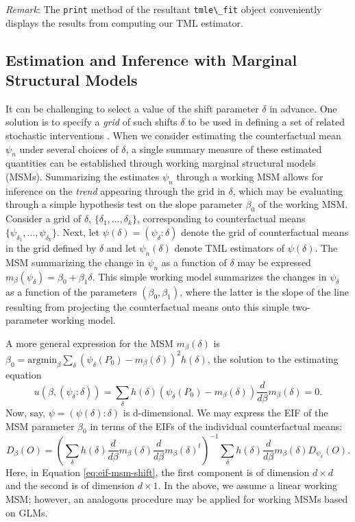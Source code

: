 \documentclass[
  12pt, krantz2,
]{krantz}
\newcommand{\passthrough}[1]{#1}
\newcommand{\1}{\mathbbm{1}}
\theoremstyle{definition}
\theoremstyle{definition}
\theoremstyle{definition}
\theoremstyle{definition}
\theoremstyle{remark}
\begin{document}
\emph{Remark}: The \passthrough{\lstinline!print!} method of the resultant \passthrough{\lstinline!tmle\_fit!} object conveniently
displays the results from computing our TML estimator.

\hypertarget{estimation-and-inference-with-marginal-structural-models}{%
\subsection{Estimation and Inference with Marginal Structural Models}\label{estimation-and-inference-with-marginal-structural-models}}

It can be challenging to select a value of the shift parameter \(\delta\) in
advance. One solution is to specify a \emph{grid} of such shifts \(\delta\) to be used
in defining a set of related stochastic interventions \citep{hejazi2020efficient}.
When we consider estimating the counterfactual mean \(\psi_n\) under several
choices of \(\delta\), a single summary measure of these estimated quantities can
be established through working marginal structural models (MSMs). Summarizing
the estimates \(\psi_n\) through a working MSM allows for inference on the \emph{trend}
appearing through the grid in \(\delta\), which may be evaluating through a simple
hypothesis test on the slope parameter \(\beta_0\) of the working MSM. Consider a
grid of \(\delta\), \(\{\delta_1, \ldots, \delta_k\}\), corresponding to
counterfactual means \(\{\psi_{\delta_1}, \ldots, \psi_{\delta_k}\}\). Next, let
\(\psi(\delta) = (\psi_{\delta}: \delta)\) denote the grid of
counterfactual means in the grid defined by \(\delta\) and let \(\psi_n(\delta)\)
denote TML estimators of \(\psi(\delta)\). The MSM summarizing the change in
\(\psi_n\) as a function of \(\delta\) may be expressed \(m_{\beta}(\psi_{\delta}) = \beta_0 + \beta_1 \delta\). This simple working model summarizes the changes in
\(\psi_{\delta}\) as a function of the parameters \((\beta_0, \beta_1)\), where the
latter is the slope of the line resulting from projecting the counterfactual
means onto this simple two-parameter working model.

A more general expression for the MSM \(m_{\beta}(\delta)\) is \(\beta_0 = \text{argmin}_{\beta} \sum_{\delta}(\psi_{\delta}(P_0) - m_{\beta}(\delta))^2 h(\delta)\), the solution to the estimating equation
\[u(\beta, (\psi_{\delta}: \delta)) = \sum_{\delta}h(\delta)
\left(\psi_{\delta}(P_0) - m_{\beta}(\delta) \right) \frac{d}{d\beta}
m_{\beta}(\delta) = 0.\]
Now, say, \(\psi = (\psi(\delta): \delta)\) is d-dimensional. We may express the
EIF of the MSM parameter \(\beta_0\) in terms of the EIFs of the individual
counterfactual means:
\begin{equation}
   D_{\beta}(O) = \left(\sum_{\delta} h(\delta) \frac{d}{d\beta}
   m_{\beta}(\delta) \frac{d}{d\beta} m_{\beta}(\delta)^t \right)^{-1}
   \sum_{\delta} h(\delta) \frac{d}{d\beta} m_{\beta}(\delta)
   D_{\psi_{\delta}}(O).
   \label{eq:eif-msm-shift}
\end{equation}
Here, in Equation \eqref{eq:eif-msm-shift}, the first component is of dimension
\(d \times d\) and the second is of dimension \(d \times 1\). In the above, we
assume a linear working MSM; however, an analogous procedure may be applied for
working MSMs based on GLMs.
\end{document}
